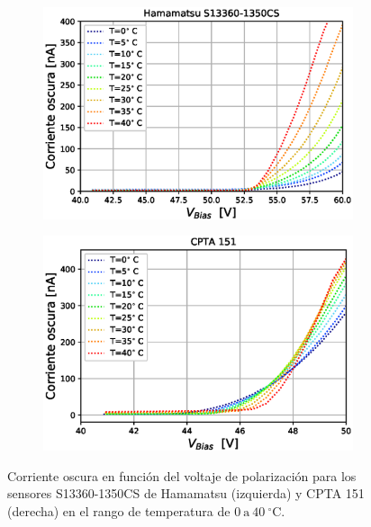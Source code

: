\begin{figure}[h!]
     \centering
     \begin{subfigure}[b]{0.49\textwidth}
         \centering
         \includegraphics[width=1.1\textwidth]{Images/dc_13360.eps}
         \caption{}
         \label{fig:dc_13360}
     \end{subfigure}
     \begin{subfigure}[b]{0.49\textwidth}
         \centering
         \includegraphics[width=1.1\textwidth]{Images/dc_CPTA.eps}
         \caption{}
         \label{fig:dc_cpta}
     \end{subfigure}
        \caption{Corriente oscura en función del voltaje de polarización para los sensores S13360-1350CS de Hamamatsu (izquierda) y CPTA 151 (derecha) en el rango de temperatura de $0~\mbox{a}~40~^\circ$C.}
        \label{fig:dc}
\end{figure}
